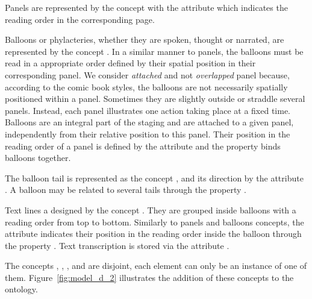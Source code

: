 Panels are represented by the concept  with the attribute  which indicates the reading order in the corresponding page.

Balloons or phylacteries, whether they are spoken, thought or narrated, are represented by the concept .
In a similar manner to panels, the balloons must be read in a appropriate order defined by their spatial position in their corresponding panel.
We consider \emph{attached} and not \emph {overlapped} panel because, according to the comic book styles, the balloons are not necessarily spatially positioned within a panel.
Sometimes they are slightly outside or straddle several panels.
Instead, each panel illustrates one action taking place at a fixed time.
Balloons are an integral part of the staging and are attached to a given panel, independently from their relative position to this panel.
Their position in the reading order of a panel is defined by the attribute  and the property  binds balloons together.

The balloon tail is represented as the concept , and its direction by the attribute .
A balloon may be related to several tails through the property .

Text lines a designed by the concept .
They are grouped inside balloons with a reading order from top to bottom.
Similarly to panels and balloons concepts, the attribute  indicates their position in the reading order inside the balloon through the property .
Text transcription is stored via the attribute .


The concepts , , ,  and  are disjoint, each element can only be an instance of one of them.  
Figure~\ref{fig:model_d_2} illustrates the addition of these concepts to the ontology.

